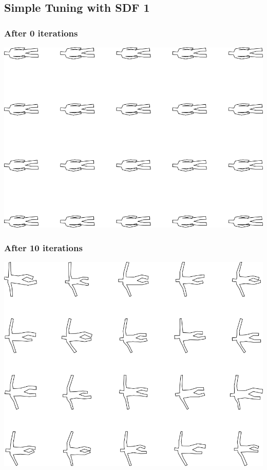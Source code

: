 \subsection{Simple Tuning with SDF 1}

\subsubsection{After 0 iterations}

\includegraphics[width=6in]{output/3.learning/simple_tuning/simple_tuning_iter0_.png}
\subsubsection{After 10 iterations}

\includegraphics[width=6in]{output/3.learning/simple_tuning/simple_tuning_iter10_.png}
